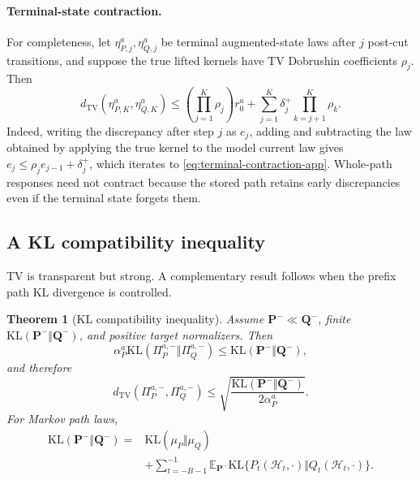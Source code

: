 \documentclass{article}
\newcommand{\E}{\mathbb E}
\newcommand{\KL}{\mathrm{KL}}
\newcommand{\TV}{d_{\mathrm{TV}}}
\newcommand{\Hist}{\mathcal H}
\newcommand{\PathP}{\mathbf P}
\newcommand{\PathQ}{\mathbf Q}
\newtheorem{theorem}[definition]{Theorem}
\theoremstyle{remark}
\begin{document}
\paragraph{Terminal-state contraction.}
For completeness, let \(\eta_{P,j}^a,\eta_{Q,j}^a\) be terminal augmented-state
laws after \(j\) post-cut transitions, and suppose the true lifted kernels have
TV Dobrushin coefficients \(\rho_j\). Then
\begin{equation}
  \TV(\eta_{P,K}^a,\eta_{Q,K}^a)
  \leq
  \left(\prod_{j=1}^{K}\rho_j\right)r_0^a
  +
  \sum_{j=1}^{K}\delta_j^+
  \prod_{k=j+1}^{K}\rho_k.
  \label{eq:terminal-contraction-app}
\end{equation}
Indeed, writing the discrepancy after step \(j\) as \(e_j\), adding and
subtracting the law obtained by applying the true kernel to the model current
law gives
\(e_j\leq\rho_je_{j-1}+\delta_j^+\), which iterates to
\cref{eq:terminal-contraction-app}. Whole-path responses need not contract
because the stored path retains early discrepancies even if the terminal
state forgets them.

\subsection{A KL compatibility inequality}

TV is transparent but strong. A complementary result follows when the prefix
path KL divergence is controlled.

\begin{theorem}[KL compatibility inequality]
\label{thm:kl-compatibility-app}
Assume \(\PathP^-\ll\PathQ^-\), finite
\(\KL(\PathP^-\Vert\PathQ^-)\), and positive target normalizers. Then
\begin{equation}
  \alpha_P^a
  \KL(\Pi_P^{a,-}\Vert\Pi_Q^{a,-})
  \leq
  \KL(\PathP^-\Vert\PathQ^-),
  \label{eq:kl-compatibility-app}
\end{equation}
and therefore
\begin{equation}
  \TV(\Pi_P^{a,-},\Pi_Q^{a,-})
  \leq
  \sqrt{
    \frac{\KL(\PathP^-\Vert\PathQ^-)}
         {2\alpha_P^a}
  }.
  \label{eq:kl-tv-app}
\end{equation}
For Markov path laws,
\begin{equation}
\begin{split}
  \KL(\PathP^-\Vert\PathQ^-)
  ={}&
  \KL(\mu_P\Vert\mu_Q)\\
  &+
  \sum_{t=-B-1}^{-1}
  \E_{\PathP^-}
  \KL\{P_t(\Hist_t,\cdot)\Vert Q_t(\Hist_t,\cdot)\}.
\end{split}
\label{eq:path-kl-chain-app}
\end{equation}
\end{theorem}
\end{document}
